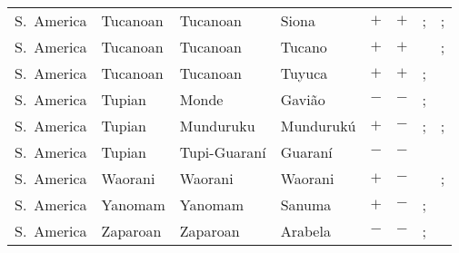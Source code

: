 \begin{landscape}
\begin{longtable}{l>{\raggedright\arraybackslash}p{2.2cm}>{\raggedright}p{2.5cm}>{\raggedright\arraybackslash}p{2.5cm}cc>{\raggedright\arraybackslash}p{3.4cm}>{\raggedright\arraybackslash}p{3.4cm}}
S.~America & Tucanoan & Tucanoan & Siona & $+$ & $+$ & \citealt{Gil2013}; \citealt[256]{Derbyshire1990} & \citealt[2, 91--95, 140--141]{Wheeler1970}; \citealt[256]{Derbyshire1990}\\
S.~America & Tucanoan & Tucanoan & Tucano & $+$ & $+$ & \citealt{Gil2013} & \citealt[255--256]{Derbyshire1990}; \citealt[207--208]{Ramirez1997}\\
S.~America & Tucanoan & Tucanoan & Tuyuca & $+$ & $+$ & \citealt{Gil2013}; \citealt[354]{Derbyshire1990} & \citealt[19, 21--22]{Bowles2008}\\
S.~America & Tupian & Monde & Gavião & $-$ & $-$ & \citealt{Gil2013}; \citealt[246, 248]{Derbyshire1990} & \citealt[passim]{Moore1984}\\
S.~America & Tupian & Munduruku & Mundurukú & $+$ & $-$ & \citealt[passim]{Passer2016a}; \citealt{Gil2013} & \citealt[passim]{Passer2016a}; \citealt[261]{Derbyshire1990}\\
S.~America & Tupian & Tupi-Guaraní & Guaraní & $-$ & $-$ & \citealt{Gil2013} & \citealt{Corbett2013}\\
S.~America & Waorani & Waorani & Waorani & $+$ & $-$ & \citealt{Gil2013} & \citealt[259]{Derbyshire1990}; \citealt[125--128]{Peeke1973}\\
S.~America & Yanomam & Yanomam & Sanuma & $+$ & $-$ & \citealt{Gil2013}; \citealt[246--248]{Derbyshire1990} & \citealt[144--149, 197--198]{Borgman1990}\\
S.~America & Zaparoan & Zaparoan & Arabela & $-$ & $-$ & \citealt{Gil2013}; \citealt[256--257]{Derbyshire1990} & \citealt[22--23, 35--36]{Rich1999}\\
\end{longtable}
\end{landscape}
